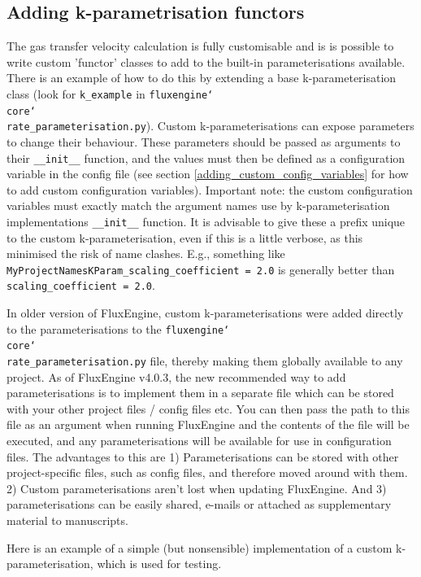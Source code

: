 \documentclass[]{scrartcl}
\begin{document}
\subsection{Adding k-parametrisation functors}
The gas transfer velocity calculation is fully customisable and is is possible to write custom 'functor' classes to add to the built-in parameterisations available. There is an example of how to do this by extending a base k-parameterisation class (look for \texttt{k\_example} in \texttt{fluxengine{\char`\\}core{\char`\\}rate\_parameterisation.py}). Custom k-parameterisations can expose parameters to change their behaviour. These parameters should be passed as arguments to their \texttt{\_\_init\_\_} function, and the values must then be defined as a configuration variable in the config file (see section \ref{adding_custom_config_variables} for how to add custom configuration variables). Important note: the custom configuration variables must exactly match the argument names use by k-parameterisation implementations \texttt{\_\_init\_\_} function. It is advisable to give these a prefix unique to the custom k-parameterisation, even if this is a little verbose, as this minimised the risk of name clashes. E.g., something like \texttt{MyProjectNamesKParam\_scaling\_coefficient = 2.0} is generally better than \texttt{scaling\_coefficient = 2.0}.

In older version of FluxEngine, custom k-parameterisations were added directly to the parameterisations to the \texttt{fluxengine{\char`\\}core{\char`\\}rate\_parameterisation.py} file, thereby making them globally available to any project. As of FluxEngine v4.0.3, the new recommended way to add parameterisations is to implement them in a separate file which can be stored with your other project files / config files etc. You can then pass the path to this file as an argument when running FluxEngine and the contents of the file will be executed, and any parameterisations will be available for use in configuration files. The advantages to this are 1) Parameterisations can be stored with other project-specific files, such as config files, and therefore moved around with them. 2) Custom parameterisations aren't lost when updating FluxEngine. And 3) parameterisations can be easily shared, e-mails or attached as supplementary material to manuscripts.

Here is an example of a simple (but nonsensible) implementation of a custom k-parameterisation, which is used for testing.
\end{document}
